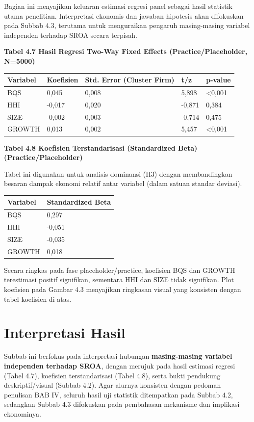 \documentclass[12pt,a4paper]{report}
\begin{document}
Bagian ini menyajikan keluaran estimasi regresi panel sebagai hasil
statistik utama penelitian. Interpretasi ekonomis dan jawaban hipotesis
akan difokuskan pada Subbab 4.3, terutama untuk menguraikan pengaruh
masing-masing variabel independen terhadap SROA secara terpisah.

\textbf{Tabel 4.7 Hasil Regresi Two-Way Fixed Effects
(Practice/Placeholder, N=5000)}

\begin{longtable}[]{@{}lllll@{}}
\toprule
Variabel & Koefisien & Std. Error (Cluster Firm) & t/z & p-value \\
\midrule
\endhead
BQS & 0,045 & 0,008 & 5,898 & \textless0,001 \\
HHI & -0,017 & 0,020 & -0,871 & 0,384 \\
SIZE & -0,002 & 0,003 & -0,714 & 0,475 \\
GROWTH & 0,013 & 0,002 & 5,457 & \textless0,001 \\
\bottomrule
\end{longtable}

\textbf{Tabel 4.8 Koefisien Terstandarisasi (Standardized Beta)
(Practice/Placeholder)}

Tabel ini digunakan untuk analisis dominansi (H3) dengan membandingkan
besaran dampak ekonomi relatif antar variabel (dalam satuan standar
deviasi).

\begin{longtable}[]{@{}ll@{}}
\toprule
Variabel & Standardized Beta \\
\midrule
\endhead
BQS & 0,297 \\
HHI & -0,051 \\
SIZE & -0,035 \\
GROWTH & 0,018 \\
\bottomrule
\end{longtable}

Secara ringkas pada fase placeholder/practice, koefisien BQS dan GROWTH
terestimasi positif signifikan, sementara HHI dan SIZE tidak signifikan.
Plot koefisien pada Gambar 4.3 menyajikan ringkasan visual yang
konsisten dengan tabel koefisien di atas.

\hypertarget{interpretasi-hasil}{%
\section{Interpretasi Hasil}\label{interpretasi-hasil}}

Subbab ini berfokus pada interpretasi hubungan \textbf{masing-masing
variabel independen terhadap SROA}, dengan merujuk pada hasil estimasi
regresi (Tabel 4.7), koefisien terstandarisasi (Tabel 4.8), serta bukti
pendukung deskriptif/visual (Subbab 4.2). Agar alurnya konsisten dengan
pedoman penulisan BAB IV, seluruh hasil uji statistik ditempatkan pada
Subbab 4.2, sedangkan Subbab 4.3 difokuskan pada pembahasan mekanisme
dan implikasi ekonominya.
\end{document}
